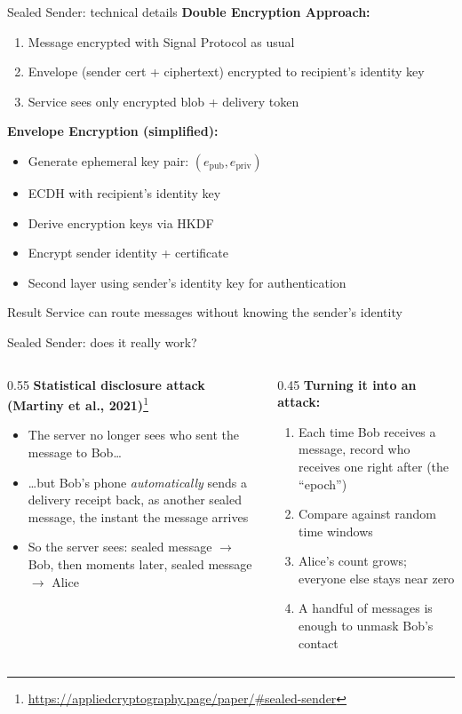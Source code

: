 \ifdefined\PRESENTATION\else\PassOptionsToClass{handout}{beamer}\fi\documentclass[aspectratio=169, lualatex]{beamer}
\begin{document}
\begin{frame}{Sealed Sender: technical details}
	\textbf{Double Encryption Approach:}
	\begin{enumerate}
		\item Message encrypted with Signal Protocol as usual
		\item Envelope (sender cert + ciphertext) encrypted to recipient's identity key
		\item Service sees only encrypted blob + delivery token
	\end{enumerate}
	\textbf{Envelope Encryption (simplified):}
	\begin{itemize}
		\item Generate ephemeral key pair: $(e_{\text{pub}}, e_{\text{priv}})$
		\item ECDH with recipient's identity key
		\item Derive encryption keys via HKDF
		\item Encrypt sender identity + certificate
		\item Second layer using sender's identity key for authentication
	\end{itemize}
	\begin{alertblock}{Result}
		Service can route messages without knowing the sender's identity
	\end{alertblock}
\end{frame}

\begin{frame}{Sealed Sender: does it really work?}
	\begin{columns}[c]
		\begin{column}{0.55\textwidth}
			\textbf{Statistical disclosure attack (Martiny et al., 2021)}\footnote{\url{https://appliedcryptography.page/paper/\#sealed-sender}}
			\begin{itemize}
				\item The server no longer sees who sent the message to Bob\ldots
				\item \ldots but Bob's phone \textit{automatically} sends a delivery receipt back, as another sealed message, the instant the message arrives
				\item So the server sees: sealed message $\rightarrow$ Bob, then moments later, sealed message $\rightarrow$ Alice
			\end{itemize}
		\end{column}
		\begin{column}{0.45\textwidth}
			\textbf{Turning it into an attack:}
			\begin{enumerate}
				\item Each time Bob receives a message, record who receives one right after (the ``epoch'')
				\item Compare against random time windows
				\item Alice's count grows; everyone else stays near zero
				\item A handful of messages is enough to unmask Bob's contact
			\end{enumerate}
		\end{column}
	\end{columns}
\end{frame}
\end{document}
